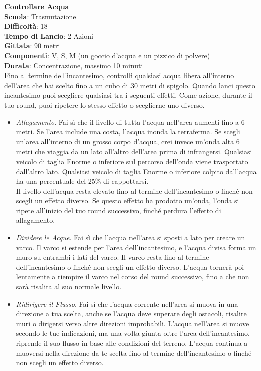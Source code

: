 \begin{multicols}{2}
\medskip\textbf{Controllare Acqua}\\
\textbf{Scuola}: Trasmutazione\\
\textbf{Difficoltà}:  18\\
\textbf{Tempo di Lancio}: 2 Azioni\\
\textbf{Gittata}: 90 metri\\
\textbf{Componenti}: V, S, M (un goccio d’acqua e un pizzico di polvere)\\
\textbf{Durata}: Concentrazione, massimo 10 minuti\\
Fino al termine dell'incantesimo, controlli qualsiasi acqua libera all'interno dell'area che hai scelto fino a un cubo di 30 metri di spigolo. Quando lanci questo incantesimo puoi scegliere qualsiasi tra i seguenti effetti. Come azione, durante il tuo round, puoi ripetere lo stesso effetto o sceglierne uno diverso.\\
\begin{itemize}
\item 
\textit{Allagamento}. Fai sì che il livello di tutta l’acqua nell'area aumenti fino a 6 metri. Se l’area include una costa, l’acqua inonda la terraferma. Se scegli un'area all'interno di un grosso corpo d’acqua, crei invece un'onda alta 6 metri che viaggia da un lato all'altro dell'area prima di infrangersi. Qualsiasi veicolo di taglia Enorme o inferiore sul percorso dell'onda viene trasportato dall'altro lato. Qualsiasi veicolo di taglia Enorme o inferiore colpito dall'acqua ha una percentuale del 25\% di cappottarsi.\\
Il livello dell'acqua resta elevato fino al termine dell'incantesimo o finché non scegli un effetto diverso. Se questo effetto ha prodotto un'onda, l’onda si ripete all'inizio del tuo round successivo, finché perdura l’effetto di allagamento.\\
\item 
\textit{Dividere le Acque}. Fai sì che l’acqua nell'area si sposti a lato per creare un varco. Il varco si estende per l’area dell'incantesimo, e l’acqua divisa forma un muro su entrambi i lati del varco. Il varco resta fino al termine dell'incantesimo o finché non scegli un effetto diverso. L’acqua tornerà poi lentamente a riempire il varco nel corso del round successivo, fino a che non sarà risalita al suo normale livello.
\item 
\textit{Ridirigere il Flusso}. Fai sì che l’acqua corrente nell'area si muova in una direzione a tua scelta, anche se l’acqua deve superare degli ostacoli, risalire muri o dirigersi verso altre direzioni improbabili. L’acqua nell'area si muove secondo le tue indicazioni, ma una volta giunta oltre l’area dell'incantesimo, riprende il suo  flusso in base alle condizioni del terreno. L’acqua continua a muoversi nella direzione da te scelta fino al termine dell'incantesimo o finché non scegli un effetto diverso.

\end{itemize}
\end{multicols}
